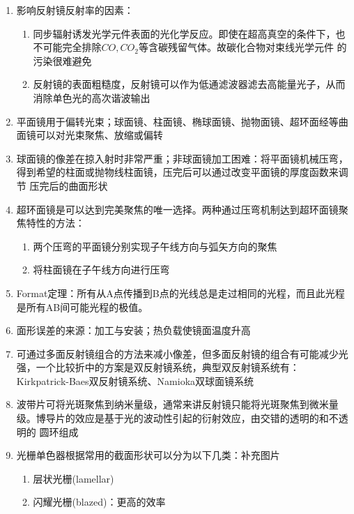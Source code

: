 \documentclass[12pt,a4paper]{article}
\begin{document}
\begin{enumerate}
            \item 影响反射镜反射率的因素：
                \begin{enumerate}
                    \item 同步辐射诱发光学元件表面的光化学反应。即使在超高真空的条件下，也不可能完全排除$CO,CO_2$等含碳残留气体。故碳化合物对束线光学元件
                        的污染很难避免
                    \item 反射镜的表面粗糙度，反射镜可以作为低通滤波器滤去高能量光子，从而消除单色光的高次谐波输出
                \end{enumerate}
            \item 平面镜用于偏转光束；球面镜、柱面镜、椭球面镜、抛物面镜、超环面经等曲面镜可以对光束聚焦、放缩或偏转
            \item 球面镜的像差在掠入射时非常严重；非球面镜加工困难：将平面镜机械压弯，得到希望的柱面或抛物线柱面镜，压完后可以通过改变平面镜的厚度函数来调节
                压完后的曲面形状
            \item 超环面镜是可以达到完美聚焦的唯一选择。两种通过压弯机制达到超环面镜聚焦特性的方法：
                \begin{enumerate}
                    \item 两个压弯的平面镜分别实现子午线方向与弧矢方向的聚焦
                    \item 将柱面镜在子午线方向进行压弯
                \end{enumerate}
            \item Format定理：所有从A点传播到B点的光线总是走过相同的光程，而且此光程是所有AB间可能光程的极值。
            \item 面形误差的来源：加工与安装；热负载使镜面温度升高
            \item 可通过多面反射镜组合的方法来减小像差，但多面反射镜的组合有可能减少光强，一个比较折中的方案是双反射镜系统，典型双反射镜系统有：
                Kirkpatrick-Baes双反射镜系统、Namioka双球面镜系统
            \item 波带片可将光斑聚焦到纳米量级，通常来讲反射镜只能将光斑聚焦到微米量级。博导片的效应是基于光的波动性引起的衍射效应，由交错的透明的和不透明的
                圆环组成
            \item 光栅单色器根据常用的截面形状可以分为以下几类：补充图片
                \begin{enumerate}
                    \item 层状光栅(lamellar)
                    \item 闪耀光栅(blazed)：更高的效率

\end{enumerate}
\end{enumerate}
\end{document}
